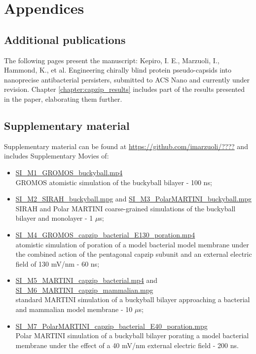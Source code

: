 
\setcounter{chapter}{-1}
\chapter{Appendices} \label{appendix}
\renewcommand{\thechapter}{A}


\section{Additional publications} \label{app:paper}
The following pages present the manuscript:
Kepiro, I. E., Marzuoli, I., Hammond, K., et al. Engineering chirally blind protein pseudo-capsids into nanoprecise antibacterial persisters, submitted to ACS Nano and currently under revision. Chapter \ref{chapter:capzip_results} includes part of the results presented in the paper, elaborating them further.





\section{Supplementary material}
\label{sec:SI}
Supplementary material can be found at \url{https://github.com/imarzuoli/????} and includes Supplementary Movies of:
\begin{itemize}
\item \url{SI_M1_GROMOS_buckyball.mp4} \\ GROMOS atomistic simulation of the buckyball bilayer - 100 ns;

\item \url{SI_M2_SIRAH_buckyball.mpg} and \url{SI_M3_PolarMARTINI_buckyball.mpg} \\ SIRAH and Polar MARTINI coarse-grained simulations of the buckyball bilayer and monolayer - 1 $\mu$s;

\item \url{SI_M4_GROMOS_capzip_bacterial_E130_poration.mp4} \\ atomistic simulation of poration of a model bacterial model membrane under the combined action of the pentagonal capzip subunit and an external electric field of 130 mV/nm - 60 ns;

\item \url{SI_M5_MARTINI_capzip_bacterial.mp4} and \url{SI_M6_MARTINI_capzip_mammalian.mpg} \\ standard MARTINI simulation of a buckyball bilayer approaching a bacterial and mammalian model membrane - 10 $\mu$s;

\item \url{SI_M7_PolarMARTINI_capzip_bacterial_E40_poration.mpg} \\ Polar MARTINI simulation of a buckyball bilayer porating a model bacterial membrane under the effect of a 40 mV/nm external electric field - 200 ns.
\end{itemize}


